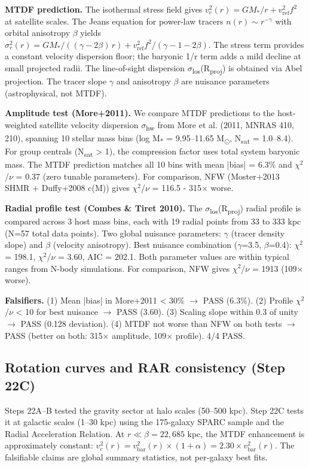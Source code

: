 \documentclass[11pt,a4paper]{article}
\begin{document}
\textbf{MTDF prediction.} The isothermal stress field gives \(v_c^2(r) = GM_*/r + v_{\mathrm{ref}}^2 f^2\) at satellite scales. The Jeans equation for power-law tracers \(n(r) \sim r^{-\gamma}\) with orbital anisotropy $\beta$ yields \(\sigma_r^2(r) = GM_*/((\gamma - 2\beta)\,r) + v_{\mathrm{ref}}^2 f^2/(\gamma - 1 - 2\beta)\). The stress term provides a constant velocity dispersion floor; the baryonic 1/\allowbreak{}r term adds a mild decline at small projected radii. The line-of-sight dispersion $\sigma$\textsubscript{los}(R\textsubscript{proj}) is obtained via Abel projection. The tracer slope $\gamma$ and anisotropy $\beta$ are nuisance parameters (astrophysical, not MTDF).

\textbf{Amplitude test (More+2011).} We compare MTDF predictions to the host-weighted satellite velocity dispersion $\sigma$\textsubscript{hw} from More et al. (2011, MNRAS 410, 210), spanning 10 stellar mass bins (log M\textsubscript{*} = 9.95--11.65 M\textsubscript{$\odot$}, N\textsubscript{sat} = 1.0--8.4). For group centrals (N\textsubscript{sat} > 1), the compression factor uses total system baryonic mass. The MTDF prediction matches all 10 bins with mean |bias| = 6.3\% and $\chi$$^{2}$/$\nu$ = 0.37 (zero tunable parameters). For comparison, NFW (Moster+2013 SHMR + Duffy+2008 c(M)) gives $\chi$$^{2}$/$\nu$ = 116.5  -  315$\times$ worse.

\textbf{Radial profile test (Combes \& Tiret 2010).} The $\sigma$\textsubscript{los}(R\textsubscript{proj}) radial profile is compared across 3 host mass bins, each with 19 radial points from 33 to 333 kpc (N=57 total data points). Two global nuisance parameters: $\gamma$ (tracer density slope) and $\beta$ (velocity anisotropy). Best nuisance combination ($\gamma$=3.5, $\beta$=0.4): $\chi$$^{2}$ = 198.1, $\chi$$^{2}$/$\nu$ = 3.60, AIC = 202.1. Both parameter values are within typical ranges from N-body simulations. For comparison, NFW gives $\chi$$^{2}$/$\nu$ = 1913 (109$\times$ worse).

\textbf{Falsifiers.} (1) Mean |bias| in More+2011 < 30\% $\rightarrow$ PASS (6.3\%). (2) Profile $\chi$$^{2}$/$\nu$ < 10 for best nuisance $\rightarrow$ PASS (3.60). (3) Scaling slope within 0.3 of unity $\rightarrow$ PASS (0.128 deviation). (4) MTDF not worse than NFW on both tests $\rightarrow$ PASS (better on both: 315$\times$ amplitude, 109$\times$ profile). 4/\allowbreak{}4 PASS.

\subsection{Rotation curves and RAR consistency (Step 22C)}
Steps 22A--B tested the gravity sector at halo scales (50--500 kpc). Step 22C tests it at galactic scales (1--30 kpc) using the 175-galaxy SPARC sample and the Radial Acceleration Relation. At \(r \ll \beta = 22{,}685\) kpc, the MTDF enhancement is approximately constant: \(v_c^2(r) = v_{\mathrm{bar}}^2(r) \times (1 + \alpha) = 2.30 \times v_{\mathrm{bar}}^2(r)\). The falsifiable claims are global summary statistics, not per-galaxy best fits.
\end{document}
